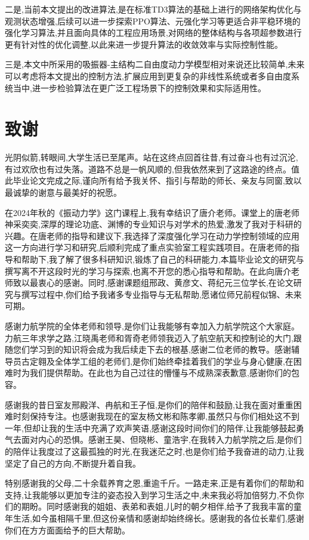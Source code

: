 \documentclass{scrbook}
\begin{document}
{二是,当前本文提出的改进算法,是在标准TD3算法的基础上进行的网络架构优化与观测状态增强,后续可以进一步探索PPO算法、元强化学习等更适合非平稳环境的强化学习算法,并且面向具体的工程应用场景,对网络的整体结构与各项超参数进行更有针对性的优化调整,以此来进一步提升算法的收敛效率与实际控制性能。

三是,本文中所采用的吸振器-主结构二自由度动力学模型相对来说还比较简单,未来可以考虑将本文提出的控制方法,扩展应用到更复杂的非线性系统或者多自由度系统当中,进一步检验算法在更广泛工程场景下的控制效果和实际适用性。

\chapter{\label{ref-095}致谢}

光阴似箭,转眼间,大学生活已至尾声。站在这终点回首往昔,有过奋斗也有过沉沦,有过欢欣也有过失落。道路不总是一帆风顺的,但我依然来到了这路途的终点。值此毕业论文完成之际,谨向所有给予我关怀、指引与帮助的师长、亲友与同窗,致以最诚挚的谢意与最美好的祝愿。

在2024年秋的《振动力学》这门课程上,我有幸结识了唐介老师。课堂上的唐老师神采奕奕,深厚的理论功底、渊博的专业知识与对学术的热爱,激发了我对于科研的兴趣。在唐老师的指导和建议下,我选择了深度强化学习在动力学控制领域的应用这一方向进行学习和研究,后顺利完成了重点实验室工程实践项目。在唐老师的指导和帮助下,我了解了很多科研知识,锻炼了自己的科研能力,本篇毕业论文的研究与撰写离不开这段时光的学习与探索,也离不开您的悉心指导和帮助。在此向唐介老师致以最衷心的感谢。同时,感谢课题组邢政、黄彦文、蒋纪元三位学长,在论文研究与撰写过程中,你们给予我诸多专业指导与无私帮助,愿诸位师兄前程似锦、未来可期。

感谢力航学院的全体老师和领导,是你们让我能够有幸加入力航学院这个大家庭。力航三年求学之路,江晓禹老师和胥奇老师领我迈入了航空航天和控制论的大门,跟随您们学习到的知识将会成为我后续走下去的根基,感谢二位老师的教导。感谢辅导员古定翱及全体学工组的老师们,是你们始终牵挂着我们的学业与身心健康,在困难时为我们提供帮助。在此也为自己过往的懵懂与不成熟深表歉意,感谢你们的包容。

感谢我的昔日室友邢殿洋、冉航和王子恒,是你们的陪伴和鼓励,让我在面对重重困难时刻保持专注。也感谢我现在的室友杨文彬和陈孝卿,虽然只与你们相处这不到一年,但却让我的生活中充满了欢声笑语,感谢这段时间你们的陪伴,让我能够鼓起勇气去面对内心的恐惧。感谢王昊、但晓彬、童浩宇,在我转入力航学院之后,是你们的陪伴让我度过了这最孤独的时光,在我迷茫之时,也是你们给予我奋进的动力,让我坚定了自己的方向,不断提升着自我。

特别感谢我的父母,二十余载养育之恩,重逾千斤。一路走来,正是有着你们的帮助和支持,让我能够以更加专注的姿态投入到学习生活之中,未来我必将加倍努力,不负你们的期盼。同时感谢我的姐姐、表弟和表姐,儿时的朝夕相伴,给予了我我丰富的童年生活,如今虽相隔千里,但这份亲情和感谢却始终绵长。感谢我的各位长辈们,感谢你们在方方面面给予的巨大帮助。

}
\end{document}
